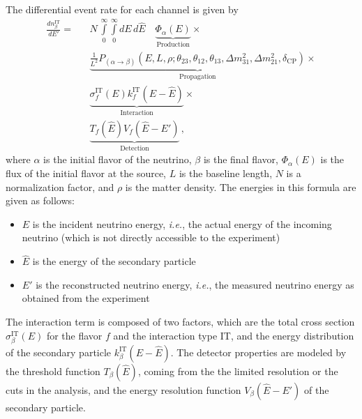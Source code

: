 \documentclass[12pt,a4paper]{article}
\newcommand{\ie}{{\it i.e.}}
\newcommand{\deltacp}{\delta_{\mathrm{CP}}}
\begin{document}
The differential event rate for each channel is given by
\begin{eqnarray}
\label{equ:master_event}
\frac{dn_{\beta}^{\text{IT}}}{dE'}=&&N\,\int\limits_0^\infty \int\limits_0^\infty dE\,d\hat{E}\quad
\underbrace{\Phi_{\alpha} (E)}_{\mathrm{Production}} \times \nonumber\\
&&\underbrace{\frac{1}{L^2} P_{(\alpha\rightarrow\beta)}(E,L,\rho;\theta_{23},
\theta_{12},\theta_{13},
\Delta m^2_{31},\Delta m^2_{21},\deltacp)}_{\mathrm{Propagation}}
\times \nonumber \\ &&\underbrace{\sigma^{\text{IT}}_f(E)
k_f^{\text{IT}}(E-\hat{E})}_{\mathrm{Interaction}} \times \nonumber \\
&&\underbrace{ T_f(\hat{E}) V_f(\hat{E}-E')}_{\mathrm{Detection}}\,,
\end{eqnarray}
where $\alpha$ is the initial flavor of the neutrino, 
$\beta$ is the final flavor, $\Phi_{\alpha} (E)$ is the flux of the 
initial flavor at the
source, $L$ is the baseline length, $N$ is a normalization factor, and 
$\rho$ is the matter density. The energies in this formula are given as follows:
\begin{itemize}
\item
 $E$ is the incident neutrino energy, \ie, the actual energy of the 
incoming neutrino (which is not directly accessible to the experiment)
\item
 $\hat{E}$ is the energy of the secondary particle
\item
 $E'$ is the reconstructed neutrino energy, \ie, the measured
neutrino energy as obtained from the experiment
\end{itemize}
The interaction term is composed of 
two factors, which are the total cross section 
$\sigma^{\text{IT}}_\beta(E)$ for the flavor $f$ and
the interaction type IT, and the energy distribution of the 
secondary particle $k_\beta^{\text{IT}}(E-\hat{E})$.
The detector properties are 
modeled by the threshold function $T_\beta(\hat{E})$, coming from the the 
limited resolution or the cuts in the analysis, and the energy resolution 
function $V_\beta(\hat{E}-E')$ of the secondary particle. 
\end{document}
